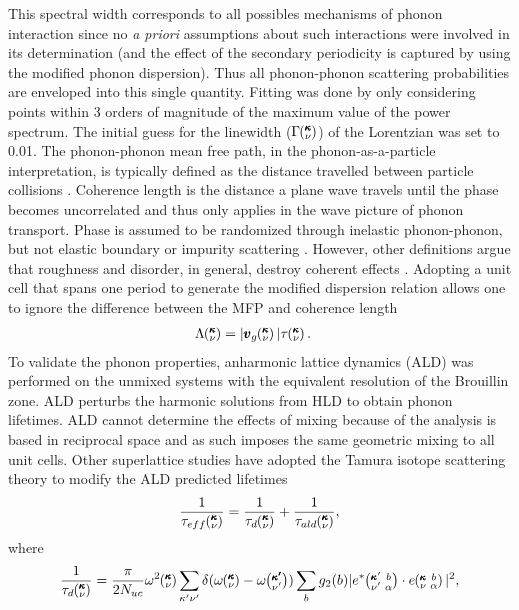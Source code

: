 \documentclass[aps,prb,preprint,preprintnumbers,amsmath,amssymb,floatfix,superscriptaddress]{revtex4}
\newcommand{\kvba}{\mspace{-4.0mu}\left(\mspace{-8.0mu}
\begin{smallmatrix} &\pmb{\kappa} &b \\ &\nu &\alpha\end{smallmatrix}
\mspace{-3.0mu}\right)}
\newcommand{\kvbap}{\mspace{-4.0mu}\left(\mspace{-8.0mu}
\begin{smallmatrix} &\pmb{\kappa}' &b \\ &\nu' &\alpha\end{smallmatrix}
\mspace{-3.0mu}\right)}
\newcommand{\kv}{\mspace{-4.0mu}\left(\mspace{-8.0mu}
\begin{smallmatrix}&\pmb{\kappa} \\&\nu\end{smallmatrix}
\mspace{-3.0mu}\right)}
\newcommand{\kvp}{\mspace{-4.0mu}\left(\mspace{-8.0mu}
\begin{smallmatrix}&\pmb{\kappa'} \\&\nu'\end{smallmatrix}
\mspace{-3.0mu}\right)}
\begin{document}
This spectral width corresponds to all possibles mechanisms of phonon interaction since no \textit{a priori} assumptions about such interactions were involved in its determination (and the effect of the secondary periodicity is captured by using the modified phonon dispersion). Thus all phonon-phonon scattering probabilities are enveloped into this single quantity. Fitting was done by only considering points within 3 orders of magnitude of the maximum value of the power spectrum. The initial guess for the linewidth ($\Gamma\kv$) of the Lorentzian was set to 0.01.
The phonon-phonon mean free path, in the phonon-as-a-particle interpretation, is typically defined as the distance travelled between particle collisions \cite{ziman_electrons_2001}. Coherence length is the distance a plane wave travels until the phase becomes uncorrelated and thus only applies in the wave picture of phonon transport. Phase is assumed to be randomized through inelastic phonon-phonon, but not elastic boundary or impurity scattering \cite{chen2005nanoscale}. However, other definitions argue that roughness and disorder, in general, destroy coherent effects \cite{PhysRevB.67.195311,dames:682}. Adopting a unit cell that spans one period to generate the modified dispersion relation allows one to ignore the difference between the MFP and coherence length
\begin{equation}\label{EQ:M:phonon_mfp}
\begin{split}
\Lambda\kv &= |\pmb{v}_{g}\kv {}| \tau\kv.
\end{split}
\end{equation}
To validate the phonon properties, anharmonic lattice dynamics \cite{PhysRevB.79.064301} (ALD) was performed on the unmixed systems with the equivalent resolution of the Brouillin zone. ALD perturbs the harmonic solutions from HLD to obtain phonon lifetimes. ALD cannot determine the effects of mixing because of the analysis is based in reciprocal space and as such imposes the same geometric mixing to all unit cells. Other superlattice studies \cite{Luckyanova16112012} have adopted the Tamura isotope scattering theory \cite{tamura_isotope_1983} to modify the ALD predicted lifetimes
\begin{equation}\label{EQ:tau_eff}
\begin{split}
\frac{1}{\tau_{eff}\kv} = \frac{1}{\tau_{d}\kv}+\frac{1}{\tau_{ald}\kv} ,
\end{split}
\end{equation}
where
\begin{equation}\label{EQ:tau_d}
\begin{split}
\frac{1}{\tau_{d}\kv} = \frac{\pi}{2N_{uc}}\omega^2\kv 
\sum_{\mathbf{\kappa'}\nu'} \delta( \omega\kv - \omega\kvp )\sum_{b} g_2(b) 
|e^*\kvbap \cdot e\kvba |^2 ,
\end{split}
\end{equation}
\end{document}
